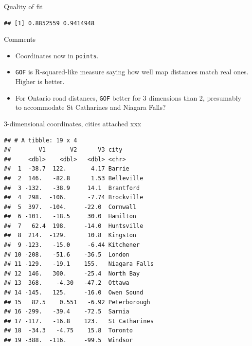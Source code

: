 \documentclass[ignorenonframetext,]{beamer}
\newenvironment{Shaded}{\begin{snugshade}}{\end{snugshade}}
\newcommand{\DataTypeTok}[1]{\textcolor[rgb]{0.13,0.29,0.53}{#1}}
\newcommand{\FloatTok}[1]{\textcolor[rgb]{0.00,0.00,0.81}{#1}}
\newcommand{\KeywordTok}[1]{\textcolor[rgb]{0.13,0.29,0.53}{\textbf{#1}}}
\newcommand{\NormalTok}[1]{#1}
\newcommand{\OperatorTok}[1]{\textcolor[rgb]{0.81,0.36,0.00}{\textbf{#1}}}
\newcommand{\StringTok}[1]{\textcolor[rgb]{0.31,0.60,0.02}{#1}}
\begin{document}
\begin{frame}[fragile]{Quality of fit}
\begin{verbatim}
## [1] 0.8852559 0.9414948
\end{verbatim}

\normalsize

\end{frame}

\begin{frame}[fragile]{Comments}
\protect\hypertarget{comments-1}{}

\begin{itemize}
\item
  Coordinates now in \texttt{points}.
\item
  \texttt{GOF} is R-squared-like measure saying how well map distances
  match real ones. Higher is better.
\item
  For Ontario road distances, \texttt{GOF} better for 3 dimensions than
  2, presumably to accommodate St Catharines and Niagara Falls?
\end{itemize}

\end{frame}

\begin{frame}[fragile]{3-dimensional coordinates, cities attached xxx}
\protect\hypertarget{dimensional-coordinates-cities-attached-xxx}{}

\scriptsize

\begin{Shaded}
\end{Shaded}

\begin{verbatim}
## # A tibble: 19 x 4
##        V1       V2      V3 city         
##     <dbl>    <dbl>   <dbl> <chr>        
##  1  -38.7  122.       4.17 Barrie       
##  2  146.   -82.8      1.53 Belleville   
##  3 -132.   -38.9     14.1  Brantford    
##  4  298.  -106.      -7.74 Brockville   
##  5  397.  -104.     -22.0  Cornwall     
##  6 -101.   -18.5     30.0  Hamilton     
##  7   62.4  198.     -14.0  Huntsville   
##  8  214.  -129.      10.8  Kingston     
##  9 -123.   -15.0     -6.44 Kitchener    
## 10 -208.   -51.6    -36.5  London       
## 11 -129.   -19.1    155.   Niagara Falls
## 12  146.   300.     -25.4  North Bay    
## 13  368.    -4.30   -47.2  Ottawa       
## 14 -145.   125.     -16.0  Owen Sound   
## 15   82.5    0.551   -6.92 Peterborough 
## 16 -299.   -39.4    -72.5  Sarnia       
## 17 -117.   -16.8    123.   St Catharines
## 18  -34.3   -4.75    15.8  Toronto      
## 19 -388.  -116.     -99.5  Windsor
\end{verbatim}

\normalsize

\end{frame}
\end{document}
